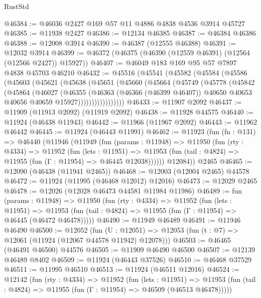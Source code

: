 \begin{lexlean}{RustStd}
\begin{coremodule}
@46384 := @46036 @2427 @169 @57 @11 @4886 @4838 @4536 @3914 @45727
@46385 := @11938 @2427
@46386 := @12134 @46385
@46387 := @46384 @46386
@46388 := @12008 @3914
@46390 := @46387 (@12555 @46388)
@46391 := @12032 @3914
@46399 := @46372 (@46375 (@46390 (@12559 @46391) (@12564 (@12566 @2427)) @15927))
@46407 := @46049 @183 @169 @95 @57 @7897 @4838 @45703 @46210
@46432 := @45516
    (@45541
      (@45582
        (@45584
          (@45586
            (@45603
              (@45621
                (@45638
                  (@45651
                    (@45660
                      (@45664
                        (@45749
                          (@45778
                            (@45842
                              (@45864
                                (@46027
                                  (@46355
                                    (@46363
                                      (@46366 (@46399 @46407))
                                      @40650
                                      @40653
                                      @40656
                                      @40659
                                      @15927)))))))))))))))))
@46433 := @11907 @2092
@46437 := @11909 (@11913 @2092) (@11919 @2092)
@46438 := @11928 @44575
@46440 := @11924 (@46438 @11943)
@46442 := @11966 (@11967 @2092)
@46443 := @11962 @46442
@46445 := @11924 (@46443 @11991)
@46462 := @11923
    (fun (fn : @131) =>
    @46440
      (@11946
        (@11949
          (fun (params : @11948) =>
          @11950
            (fun (rty : @4334) =>
            @11952
              (fun (lets : @11951) =>
              @11953 (fun (tail : @4824) => @11955 (fun (Γ : @11954) => @46445 @12038))))))
        @12084))
    @2465
@46465 := @12090 (@46438 (@11941 @2465))
@46468 := @12003 (@12004 @2465) @44578
@46472 := @11924 (@11995 (@46468 @12012) @12016)
@46473 := @12029 @2465
@46478 := @12026 (@12028 @46473 @44581 @11984 @11986)
@46489 := fun (params : @11948) =>
  @11950
    (fun (rty : @4334) =>
    @11952
      (fun (lets : @11951) =>
      @11953 (fun (tail : @4824) => @11955 (fun (Γ : @11954) => @46445 (@46472 @46478)))))
@46490 := @11949 @46489
@46491 := @11946 @46490
@46500 := @12052
    (fun (U : @12051) => @12053 (fun (t : @7) => @12061 (@11924 (@12067 @44578 @11942) @12078)))
@46503 := @46465 (@46491 @46500) @44576
@46505 := @11909 @46490 @46500
@46507 := @12139 @46489 @8402
@46509 := @11924 (@46443 @37526)
@46510 := @46468 @37529
@46511 := @11995 @46510
@46513 := @11924 (@46511 @12016)
@46524 := @12142
    (fun (rty : @4334) =>
    @11952
      (fun (lets : @11951) =>
      @11953 (fun (tail : @4824) => @11955 (fun (Γ : @11954) => @46509 (@46513 @46478)))))

\end{coremodule}
\end{lexlean}
